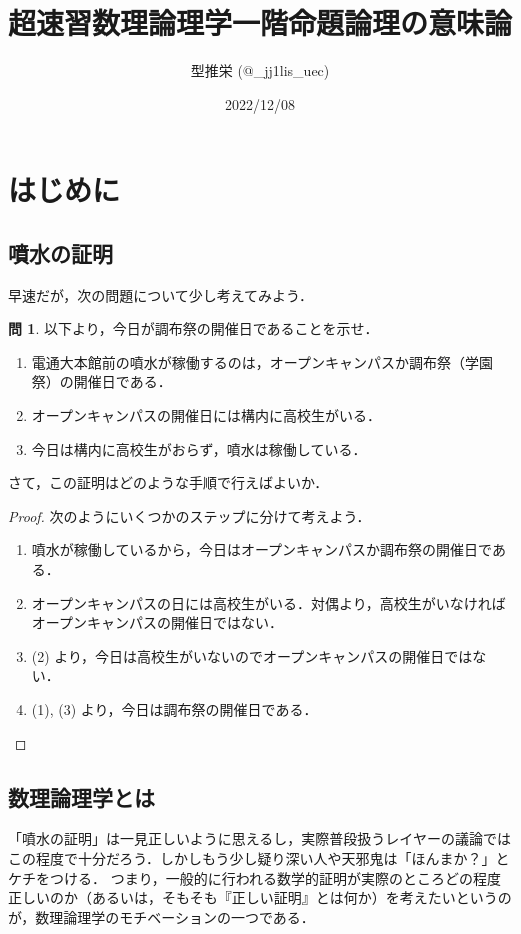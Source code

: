 \documentclass[uplatex,a4paper,dvipdfmx]{jsarticle}
\title{超速習数理論理学\quad 一階命題論理の意味論}
\author{型推栄 (@\_jj1lis\_uec)}
\date{2022/12/08}
\theoremstyle{definition}
\newtheorem{question}{問}
\begin{document}
    \maketitle

    \section{はじめに}
    \subsection{噴水の証明}
    早速だが，次の問題について少し考えてみよう．
    \begin{question}\label{q:fountain}
        以下より，今日が調布祭の開催日であることを示せ．
        \begin{enumerate}
            \item 電通大本館前の噴水が稼働するのは，オープンキャンパスか調布祭（学園祭）の開催日である．
            \item オープンキャンパスの開催日には構内に高校生がいる．
            \item 今日は構内に高校生がおらず，噴水は稼働している．
        \end{enumerate}
    \end{question}
    さて，この証明はどのような手順で行えばよいか．

    \begin{proof} 次のようにいくつかのステップに分けて考えよう．
        \begin{enumerate}
            \item 噴水が稼働しているから，今日はオープンキャンパスか調布祭の開催日である．
            \item オープンキャンパスの日には高校生がいる．対偶より，高校生がいなければオープンキャンパスの開催日ではない．
            \item (2) より，今日は高校生がいないのでオープンキャンパスの開催日ではない．
            \item (1), (3) より，今日は調布祭の開催日である．
        \end{enumerate}
    \end{proof}

    \subsection{数理論理学とは}
        「噴水の証明」は一見正しいように思えるし，実際普段扱うレイヤーの議論ではこの程度で十分だろう．しかしもう少し疑り深い人や天邪鬼は「ほんまか？」とケチをつける．
        つまり，一般的に行われる数学的証明が実際のところどの程度正しいのか（あるいは，そもそも『正しい証明』とは何か）を考えたいというのが，数理論理学のモチベーションの一つである．
\end{document}
